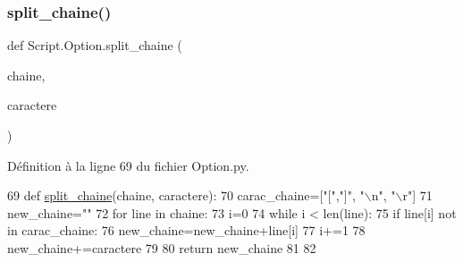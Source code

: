 \subsubsection{\texorpdfstring{split\+\_\+chaine()}{split\_chaine()}}
{\footnotesize\ttfamily def Script.\+Option.\+split\+\_\+chaine (\begin{DoxyParamCaption}\item[{}]{chaine,  }\item[{}]{caractere }\end{DoxyParamCaption})}



Définition à la ligne 69 du fichier Option.\+py.


\begin{DoxyCode}
69 \textcolor{keyword}{def }\hyperlink{namespaceScript_1_1Option_ac71533bc42f23543f3c564ccf01d9faf}{split\_chaine}(chaine, caractere):
70     carac\_chaine=[\textcolor{stringliteral}{"["},\textcolor{stringliteral}{"]"}, \textcolor{stringliteral}{"\(\backslash\)n"}, \textcolor{stringliteral}{"\(\backslash\)r"}]
71     new\_chaine=\textcolor{stringliteral}{""}
72     \textcolor{keywordflow}{for} line \textcolor{keywordflow}{in} chaine:
73         i=0
74         \textcolor{keywordflow}{while} i < len(line):
75             \textcolor{keywordflow}{if} line[i] \textcolor{keywordflow}{not} \textcolor{keywordflow}{in} carac\_chaine:
76                 new\_chaine=new\_chaine+line[i]
77             i+=1
78         new\_chaine+=caractere
79 
80     \textcolor{keywordflow}{return} new\_chaine
81 
82 
\end{DoxyCode}

